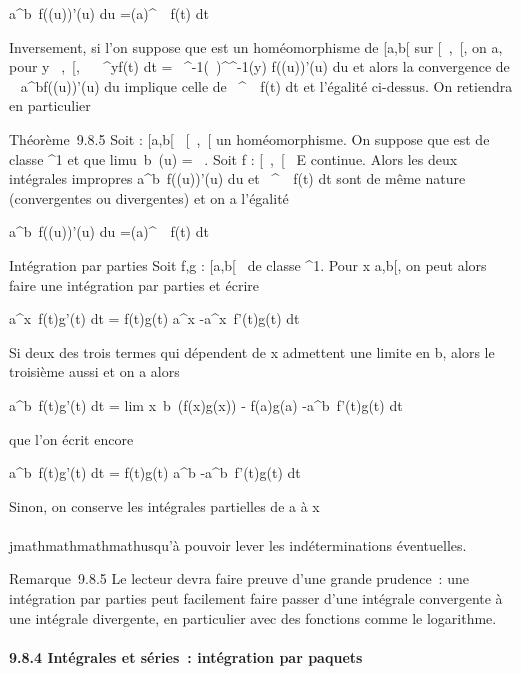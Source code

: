 \int  a^b~f(\phi(u))\phi'(u) du
=\int  \phi(a)^\beta~~f(t) dt

Inversement, si l'on suppose que \phi est un homéomorphisme de {[}a,b{[}
sur {[}\alpha~,\beta~{[}, on a, pour y \in {[}\alpha~,\beta~{[}, \int ~
\alpha~^yf(t) dt =\int ~
\phi^-1(\alpha~)^\phi^-1(y) f(\phi(u))\phi'(u) du et
alors la convergence de \int ~
a^bf(\phi(u))\phi'(u) du implique celle de
\int  \alpha~^\beta~~f(t) dt et l'égalité
ci-dessus. On retiendra en particulier

Théorème~9.8.5 Soit \phi : {[}a,b{[}\rightarrow~ {[}\alpha~,\beta~{[} un homéomorphisme. On
suppose que \phi est de classe ^1 et que
limu\rightarrow~b~\phi(u) = \beta~. Soit f : {[}\alpha~,\beta~{[}\rightarrow~
E continue. Alors les deux intégrales impropres
\int  a^b~f(\phi(u))\phi'(u) du et
\int  \alpha~^\beta~~f(t) dt sont de même
nature (convergentes ou divergentes) et on a l'égalité

\int  a^b~f(\phi(u))\phi'(u) du
=\int  \phi(a)^\beta~~f(t) dt

Intégration par parties Soit f,g : {[}a,b{[}\rightarrow~  de classe
^1. Pour x \in {[}a,b{[}, on peut alors faire une intégration
par parties et écrire

\int  a^x~f(t)g'(t) dt =
\left {[}f(t)g(t)\right {]}
a^x -\int  a^x~f'(t)g(t)
dt

Si deux des trois termes qui dépendent de x admettent une limite en b,
alors le troisième aussi et on a alors

\int  a^b~f(t)g'(t) dt
= lim x\rightarrow~b~(f(x)g(x)) - f(a)g(a)
-\int  a^b~f'(t)g(t) dt

que l'on écrit encore

\int  a^b~f(t)g'(t) dt =
\left {[}f(t)g(t)\right {]}
a^b -\int  a^b~f'(t)g(t)
dt

Sinon, on conserve les intégrales partielles de a à x \\\\jmathmathmathmathusqu'à pouvoir
lever les indéterminations éventuelles.

Remarque~9.8.5 Le lecteur devra faire preuve d'une grande prudence~: une
intégration par parties peut facilement faire passer d'une intégrale
convergente à une intégrale divergente, en particulier avec des
fonctions comme le logarithme.

\paragraph{9.8.4 Intégrales et séries~: intégration par paquets}

